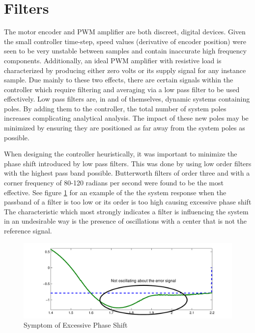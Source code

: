 \section{Filters}
\label{sec:filters}

The motor encoder and PWM amplifier are both discreet, digital devices. 
Given the small controller time-step, speed values (derivative of encoder position) were seen to be very unstable between samples and contain inaccurate high frequency components. %
Additionally, an ideal PWM amplifier with resistive load is characterized by producing either zero volts or its supply signal for any instance sample. 
Due mainly to these two effects, there are certain signals within the controller which require filtering and averaging via a low pass filter to be used effectively.
Low pass filters are, in and of themselves, dynamic systems containing poles.
By adding them to the controller, the total number of system poles increases complicating analytical analysis.
The impact of these new poles may be minimized by ensuring they are positioned as far away from the system poles as possible.

When designing the controller heuristically, it was important to minimize the phase shift introduced by low pass filters.
This was done by using low order filters with the highest pass band possible. 
Butterworth filters of order three and with a corner frequency of 80-120 radians per second were found to be the most effective.
See figure \ref{fig:filtererror} for an example of the the system response when the passband of a filter is too low or its order is too high causing excessive phase shift
The characteristic which most strongly indicates a filter is influencing the system in an undesirable way is the presence of oscillations with a center that is not the reference signal.

\begin{figure}[htp]
    \centering
    \includegraphics[width=.9\textwidth]{images/FilterPassbandTooLow.pdf}
    \caption{Symptom of Excessive Phase Shift}
    \label{fig:filtererror}
\end{figure}
